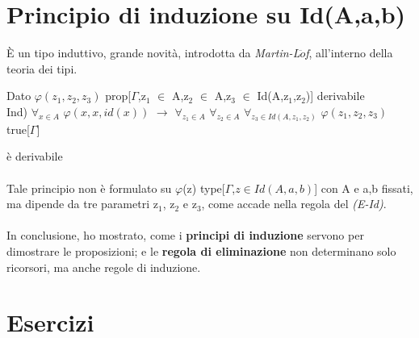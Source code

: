 \section{Principio di induzione su Id(A,a,b)}
\label{sec:principio-di-induzione-Id}
\`E un tipo induttivo, grande novit\`a, introdotta da \textit{Martin-L$\ddot{o}$f}, all'interno della teoria dei tipi.\\
\begin{center}Dato $\varphi(z_1,z_2,z_3)$ prop[$\Gamma$,z$_1$ $\in$ A,z$_2$ $\in$ A,z$_3$ $\in$ Id(A,z$_1$,z$_2$)] derivabile\\
Ind) $\forall_{x \in A}$ $\varphi(x,x,id(x))$ $\rightarrow$ $\forall_{z_1 \in A}$ $\forall_{z_2 \in A}$ $\forall_{z_3 \in Id(A,z_1,z_2)}$ $\varphi(z_1,z_2,z_3)$ true[$\Gamma$]\end{center} \`e derivabile\\\\
\noindent
Tale principio non \`e formulato su $\varphi$(z) type[$\Gamma$,$z \in Id(A,a,b)$] con A e a,b fissati, ma dipende da tre parametri z$_1$, z$_2$ e z$_3$, come accade nella regola del \textit{(E-Id)}.\\\\
\noindent In conclusione,  ho mostrato, come i \textbf{principi di induzione} servono per dimostrare le proposizioni; e le \textbf{regola di eliminazione} non determinano solo ricorsori, ma anche regole di induzione.

\section{Esercizi}
\label{sec:esercizi-principi-induzione}
